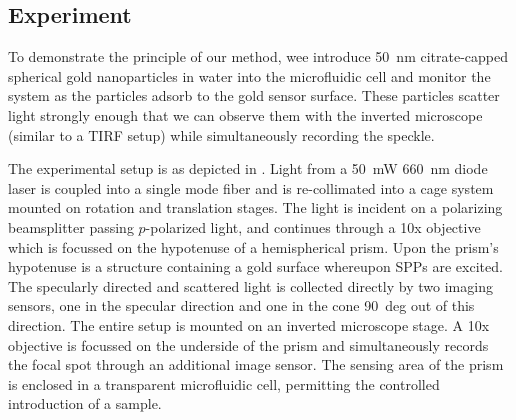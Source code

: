 %
%
%
%
%
%
%


\subsection{Experiment}
To demonstrate the principle of our method, wee introduce
\SI{50}{\nano\meter} citrate-capped spherical gold nanoparticles in water
into the microfluidic cell and monitor the system as the particles adsorb
to the gold sensor surface.  These particles scatter light strongly enough
that we can observe them with the inverted microscope (similar to a TIRF
setup) while simultaneously recording the speckle. 

The experimental setup is as depicted in .  Light from
a \SI{50}{\milli\watt} \SI{660}{\nano\meter} diode laser is coupled into a
single mode fiber and is re-collimated into a cage system mounted on
rotation and translation stages.  The light is incident on a polarizing
beamsplitter passing $p$-polarized light, and continues through a 10x
objective which is focussed on the hypotenuse of a hemispherical prism.
Upon the prism's hypotenuse is a structure containing a gold surface
whereupon SPPs are excited.  The specularly directed and scattered light is
collected directly by two imaging sensors, one in the specular direction
and one in the cone \SI{90}{deg} out of this direction.  The entire setup
is mounted on an inverted microscope stage.  A 10x objective is focussed on
the underside of the prism and simultaneously records the focal spot
through an additional image sensor.  The sensing area of the prism is
enclosed in a transparent microfluidic cell, permitting the controlled
introduction of a sample.


